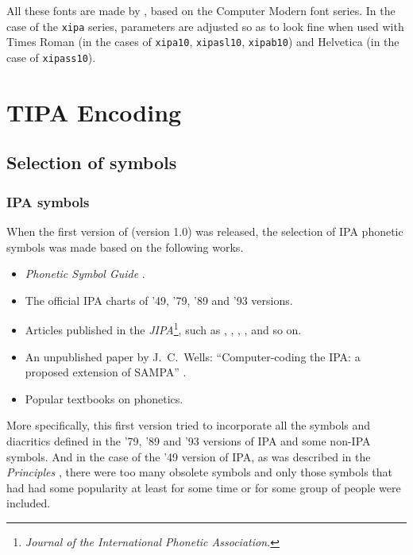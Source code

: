 All these fonts are made by \MF{}, based on the Computer Modern font
series. In the case of the \texttt{xipa} series, parameters are
adjusted so as to look fine when used with Times Roman (in the cases
of \texttt{xipa10}, \texttt{xipasl10}, \texttt{xipab10}) and Helvetica
(in the case of \texttt{xipass10}).


\clearemptydoublepage
\chapter{TIPA Encoding}

\section{Selection of symbols}\label{sec:selection}

\subsection{IPA symbols}

When the first version of \tipa{} (version 1.0) was released, the
selection of IPA phonetic symbols was made based on the following
works.

\begin{itemize}
\item \emph{Phonetic Symbol Guide} \citep{PSG:I}.
\item The official IPA charts of '49, '79, '89 and '93 versions.
\item Articles published in the
  \emph{JIPA}\footnote{\emph{Journal of the International Phonetic
      Association.}}, such as \cite{IPA:KielConvention},
  \cite{IPA:FurtherReport}, \cite{Esling:ComputerCodes},
  \cite{IPA:CouncilActions}, and so on.
\item An unpublished paper by J.\ C.\ Wells:
 ``Computer-coding the IPA: a proposed extension of SAM\-PA'' \citep{SAMPA}.
\item Popular textbooks on phonetics.
\end{itemize}

More specifically, this first version tried to incorporate all the
symbols and diacritics defined in the '79, '89 and '93 versions of IPA
and some non-IPA symbols. And in the case of the '49 version of
IPA, as was described in the \textit{Principles} \citep{Principles},
there were too many obsolete symbols and only those symbols that had
had some popularity at least for some time or for some group of people
were included.

